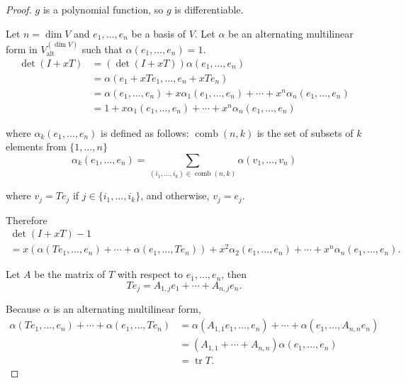 \begin{proof}
    $g$ is a polynomial function, so $g$ is differentiable.

    Let $n = \dim V$ and $e_{1}, \ldots, e_{n}$ be a basis of $V$. Let $\alpha$ be an alternating multilinear form in $V^{(\dim V)}_{\text{alt}}$ such that $\alpha(e_{1}, \ldots, e_{n}) = 1$.
    \begin{align*}
        \det(I + xT) & = (\det(I + xT))\alpha(e_{1}, \ldots, e_{n})                                                                        \\
                     & = \alpha(e_{1} + xTe_{1}, \ldots, e_{n} + xTe_{n})                                                                  \\
                     & = \alpha(e_{1}, \ldots, e_{n}) + x\alpha_{1}(e_{1}, \ldots, e_{n}) + \cdots + x^{n}\alpha_{n}(e_{1}, \ldots, e_{n}) \\
                     & = 1 + x\alpha_{1}(e_{1}, \ldots, e_{n}) + \cdots + x^{n}\alpha_{n}(e_{1}, \ldots, e_{n})
    \end{align*}

    where $\alpha_{k}(e_{1}, \ldots, e_{n})$ is defined as follows: $\operatorname{comb}(n, k)$ is the set of subsets of $k$ elements from $\{1,\ldots,n\}$
    \[
        \alpha_{k}(e_{1}, \ldots, e_{n}) = \sum_{(i_{1}, \ldots, i_{k})\in\operatorname{comb}(n,k)}\alpha(v_{1}, \ldots, v_{n})
    \]

    where $v_{j} = Te_{j}$ if $j\in\{ i_{1}, \ldots, i_{k} \}$, and otherwise, $v_{j} = e_{j}$.

    Therefore
    \begin{multline*}
        \det(I + xT) - 1 \\
        = x(\alpha(Te_{1}, \ldots, e_{n}) + \cdots + \alpha(e_{1}, \ldots, Te_{n})) + x^{2}\alpha_{2}(e_{1}, \ldots, e_{n}) + \cdots + x^{n}\alpha_{n}(e_{1}, \ldots, e_{n}).
    \end{multline*}

    Let $A$ be the matrix of $T$ with respect to $e_{1}, \ldots, e_{n}$, then
    \[
        Te_{j} = A_{1,j}e_{1} + \cdots + A_{n,j}e_{n}.
    \]

    Because $\alpha$ is an alternating multilinear form,
    \begin{align*}
        \alpha(Te_{1}, \ldots, e_{n}) + \cdots + \alpha(e_{1}, \ldots, Te_{n}) & = \alpha(A_{1,1}e_{1}, \ldots, e_{n}) + \cdots + \alpha(e_{1}, \ldots, A_{n,n}e_{n}) \\
                                                                               & = (A_{1,1} + \cdots + A_{n,n})\alpha(e_{1}, \ldots, e_{n})                           \\
                                                                               & = \operatorname{tr}T.
    \end{align*}


\end{proof}
